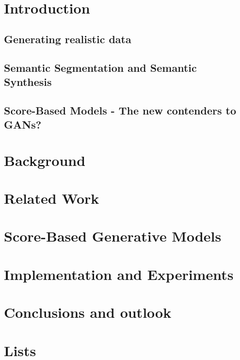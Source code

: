 \documentclass[a4paper, 12pt, oneside, BCOR=0cm]{scrbook}
\begin{document}
\mainmatter
\chapter{Introduction}
\section{Generating realistic data} %

\section{Semantic Segmentation and Semantic Synthesis} %
\section{Score-Based Models - The new contenders to GANs?} %

\chapter{Background}





\chapter{Related Work}



\chapter{Score-Based Generative Models} %





\chapter{Implementation and Experiments} \label{chap:5}



\chapter{Conclusions and outlook} %
\appendix 
\chapter{Lists}
\listoffigures
\listoftables

\listofalgorithms


\end{document}
